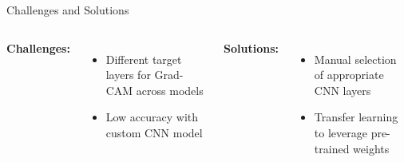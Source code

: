 \documentclass{beamer}
\begin{document}
\begin{frame}{Challenges and Solutions}
    \begin{columns}[T]
        \textbf{\textcolor{accentcolor}{Challenges:}}
        \begin{itemize}
            \item Different target layers for Grad-CAM across models
            \item Low accuracy with custom CNN model
        \end{itemize}
        
        \textbf{\textcolor{highlightcolor}{Solutions:}}
        \begin{itemize}
            \item Manual selection of appropriate CNN layers
            \item Transfer learning to leverage pre-trained weights
        \end{itemize}
    \end{columns}
\end{frame}

\end{document}
